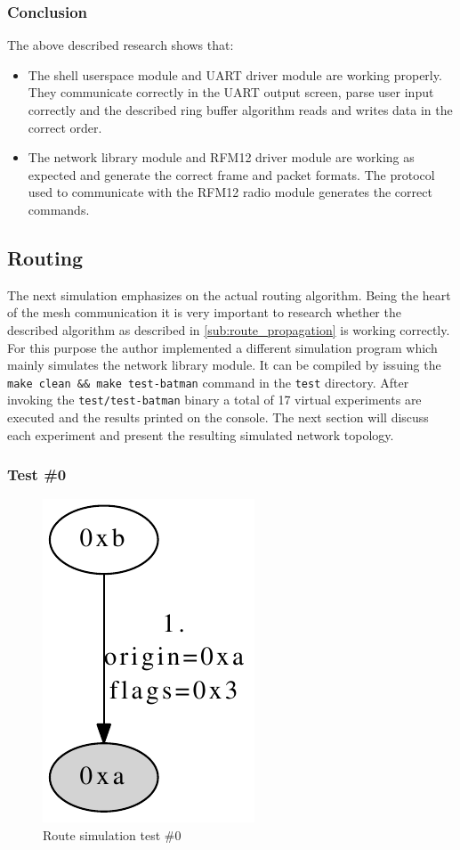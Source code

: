 \subsubsection{Conclusion} %
The above described research shows that:

\begin{itemize}
    \item The shell userspace module and UART driver module are working properly. They communicate correctly in the UART output screen, parse user input correctly and the described ring buffer algorithm reads and writes data in the correct order.
    \item The network library module and RFM12 driver module are working as expected and generate the correct frame and packet formats. The protocol used to communicate with the RFM12 radio module generates the correct commands.
\end{itemize}

\subsection{Routing}%
The next simulation emphasizes on the actual routing algorithm. Being the heart of the mesh communication it is very important to research whether the described algorithm as described in \ref{sub:route_propagation} is working correctly. For this purpose the author implemented a different simulation program which mainly simulates the network library module. It can be compiled by issuing the \texttt{make clean \&\& make test-batman} command in the \texttt{test} directory. After invoking the \texttt{test/test-batman} binary a total of 17 virtual experiments are executed and the results printed on the console. The next section will discuss each experiment and present the resulting simulated network topology.

\subsubsection{Test \#0}%
\begin{figure}[H]
  \begin{center}
    \includegraphics[]{figures/test0}
  \end{center}
  \caption{Route simulation test \#0}
  \label{fig:test0}
\end{figure}

